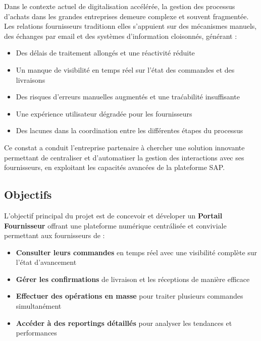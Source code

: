 \documentclass[12pt,a4paper,oneside]{report}
\begin{document}
Dans le contexte actuel de digitalisation acc\'el\'er\'ee, la gestion des processus d'achats dans les
grandes entreprises demeure complexe et souvent fragment\'ee. Les relations fournisseurs traditionn
elles s'appuient sur des m\'ecanismes manuels, des \'echanges par email et des syst\`emes d'information
cloisonn\'es, g\'en\'erant :

\begin{itemize}[label=---, itemsep=0.15em]
	\item Des d\'elais de traitement allongés et une réactivité réduite
	\item Un manque de visibilité en temps r\'eel sur l'\'etat des commandes et des livraisons
	\item Des risques d'erreurs manuelles augment\'es et une tra\'cabilit\'e insuffisante
	\item Une exp\'erience utilisateur d\'egrad\'ee pour les fournisseurs
	\item Des lacunes dans la coordination entre les diff\'erentes \'etapes du processus
\end{itemize}

Ce constat a conduit l'entreprise partenaire \`a chercher une solution innovante permettant de
centraliser et d'automatiser la gestion des interactions avec ses fournisseurs, en exploitant les
capacit\'es avanc\'ees de la plateforme SAP.

\subsection{Objectifs}\label{ch1:objectifs}

L'objectif principal du projet est de concevoir et d\'eveloper un \textbf{Portail Fournisseur} offrant une
plateforme num\'erique centr\'alis\'ee et conviviale permettant aux fournisseurs de :

\begin{itemize}[label=\textbullet, itemsep=0.2em]
	\item \textbf{Consulter leurs commandes} en temps r\'eel avec une visibilité compl\`ete sur l'\'etat d'avancement
	\item \textbf{G\'erer les confirmations} de livraison et les r\'eceptions de mani\`ere efficace
	\item \textbf{Effectuer des op\'erations en masse} pour traiter plusieurs commandes simultan\'ement
	\item \textbf{Acc\'eder \`a des reportings d\'etaill\'es} pour analyser les tendances et performances
\end{itemize}
\end{document}
